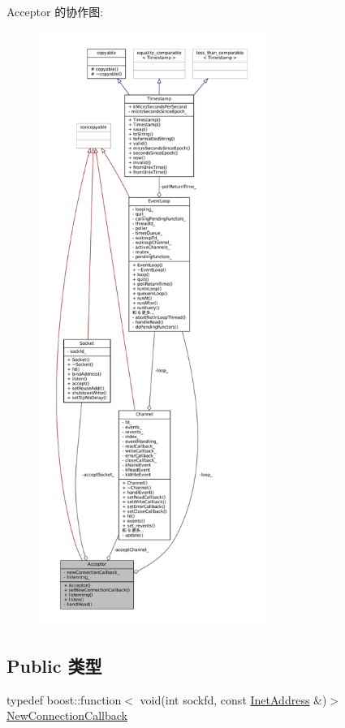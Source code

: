 Acceptor 的协作图\+:
\nopagebreak
\begin{figure}[H]
\begin{center}
\leavevmode
\includegraphics[height=550pt]{classmuduo_1_1Acceptor__coll__graph}
\end{center}
\end{figure}
\subsection*{Public 类型}
\begin{DoxyCompactItemize}
\item 
typedef boost\+::function$<$ void(int sockfd, const \hyperlink{classmuduo_1_1InetAddress}{Inet\+Address} \&)$>$ \hyperlink{classmuduo_1_1Acceptor_ad9da8988c47fddac6b0b91e01e154814}{New\+Connection\+Callback}
\end{DoxyCompactItemize}
